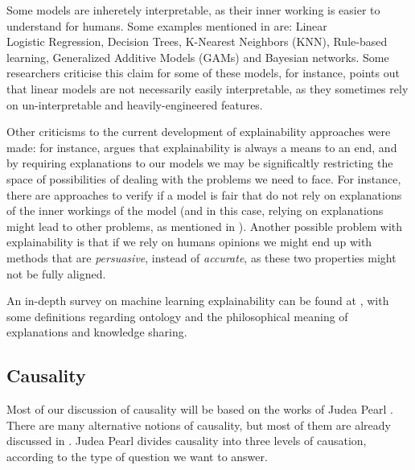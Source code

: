Some models are inheretely interpretable, as their inner working is easier to understand for humans. Some examples mentioned in \cite{Principles and Practice of Explainable Machine Learning} are: Linear\\Logistic Regression, Decision Trees, K-Nearest Neighbors (KNN), Rule-based learning, Generalized Additive Models (GAMs) and Bayesian networks. Some researchers criticise this claim for some of these models, for instance, \cite{The mythos of model interpretability: In machine learning, the concept of interpretability is both important and slippery} points out that linear models are not necessarily easily interpretable, as they sometimes rely on un-interpretable and heavily-engineered features.

Other criticisms to the current development of explainability approaches were made: for instance, \cite{Against Interpretability: a Critical Examination of the Interpretability Problem in Machine Learning} argues that explainability is always a means to an end, and by requiring explanations to our models we may be significaltly restricting the space of possibilities of dealing with the problems we need to face. For instance, there are approaches to verify if a model is fair that do not rely on explanations of the inner workings of the model (and in this case, relying on explanations might lead to other problems, as mentioned in \cite{How to explain and justify almost any decision}). Another possible problem with explainability is that if we rely on humans opinions we might end up with methods that are \textit{persuasive}, instead of \textit{accurate}, as these two properties might not be fully aligned. 

An in-depth survey on machine learning explainability can be found at \cite{A Survey on the Explainability of Supervised Machine Learning}, with some definitions regarding ontology and the philosophical meaning of explanations and knowledge sharing. 

\subsection{Causality}

Most of our discussion of causality will be based on the works of Judea Pearl \cite{Causality}. There are many alternative notions of causality, but most of them are already discussed in \cite{Causality}. Judea Pearl divides causality into three levels of causation, according to the type of question we want to answer. 

